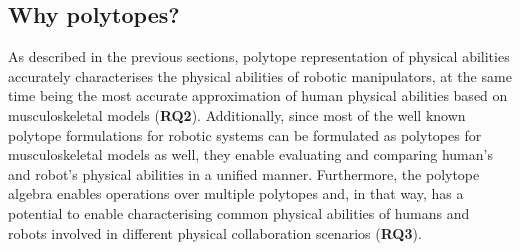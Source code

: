 

\subsection{Why polytopes?}

As described in the previous sections, polytope representation of physical abilities accurately 
characterises the physical abilities of robotic manipulators, at the same time being the most accurate approximation of human physical abilities based on musculoskeletal models (\textbf{RQ2}). Additionally, since most of the well known polytope formulations for robotic systems can be formulated as polytopes for musculoskeletal models as well, they enable evaluating and comparing human's and robot's physical abilities in a unified manner. Furthermore, the polytope algebra enables operations over multiple polytopes and, in that way, has a potential to enable characterising common physical abilities of humans and robots involved in different physical collaboration scenarios (\textbf{RQ3}).

